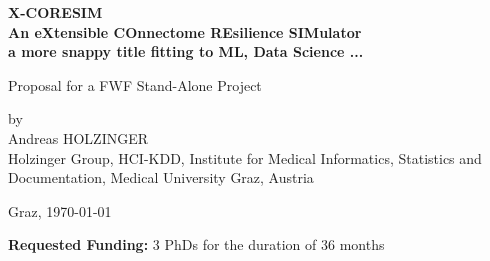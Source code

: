 \documentclass[a4paper,11pt]{article}
\begin{document}
\begin{titlepage}
\begin{center}
\bfseries\Large
X-CORESIM\\ 
An eXtensible COnnectome REsilience SIMulator \\
 a more snappy title fitting to ML, Data Science ...
\\[0,6cm]
\normalfont\normalsize

Proposal for a FWF Stand-Alone Project

by\\
Andreas HOLZINGER\\

Holzinger Group, HCI-KDD, Institute for Medical Informatics, Statistics and Documentation,
Medical University Graz, Austria
\\[0,4cm]
\vspace{0.7\baselineskip}
\begin{figure}[ht]
  \centering
\end{figure}
%
Graz, \today
%

\end{center}
\vspace{0.5\baselineskip}
\end{titlepage}
%
{\bf Requested Funding:} 3 PhDs for the duration of 36 months
\end{document}
